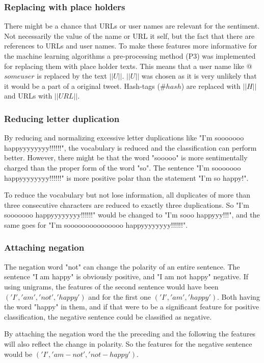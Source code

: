 \subsubsection{Replacing with place holders}
There might be a chance that URLs or user names are relevant for the sentiment. Not necessarily the value of the name or URL it self, but the fact that there are references to URLs and user names. To make these features more informative for the machine learning algorithms a pre-processing method (P3) was implemented for replacing them with place holder texts. This means that a user name like $@$$someuser$ is replaced by the text $||U||$. $||U||$ was chosen as it is very unlikely that it would be a part of a original tweet. Hash-tags ($\#hash$) are replaced with $||H||$ and URLs with $||URL||$. 

\subsubsection{Reducing letter duplication}
By reducing and normalizing excessive letter duplications like "I'm sooooooo happyyyyyyyy!!!!!!", the vocabulary is reduced and the classification can perform better. However, there might be that the word "sooooo" is more sentimentally charged than the proper form of the word "so". The sentence "I'm sooooooo happyyyyyyyy!!!!!!" is more positive polar than the statement "I'm so happy!". 

To reduce the vocabulary but not lose information, all duplicates of more than three consecutive characters are reduced to exactly three duplications. So "I'm sooooooo happyyyyyyyy!!!!!!" would be changed to "I'm sooo happyyy!!!", and the same goes for "I'm sooooooooooooooo happyyyyyyyy!!!!!!".

\subsubsection{Attaching negation}

The negation word "not" can change the polarity of an entire sentence. The sentence "I am happy" is obviously positive, and "I am not happy" negative. If using unigrams, the features of the second sentence would have been $('I', 'am', 'not', 'happy')$ and for the first one $('I', 'am', 'happy')$. Both having the word "happy" in them, and if that were to be a significant feature for positive classification, the negative sentence could be classified as negative. 

By attaching the negation word the the preceding and the following the features will also reflect the change in polarity. So the features for the negative sentence would be $('I', 'am-not', 'not-happy')$.

